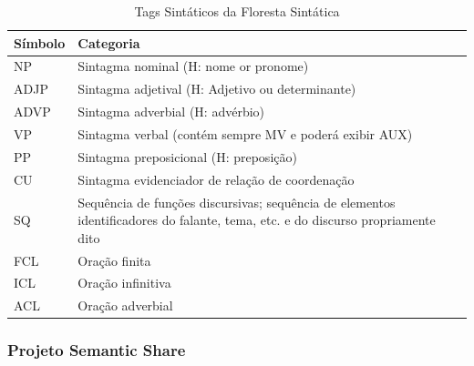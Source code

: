 \begin{table}[H]
   \centering
   \small
   \caption{ Tags Sintáticos da Floresta Sintática}
   

    \begin{tabular}{ | p{3cm} | p{10cm} | }
      \hline
        \textbf{Símbolo} & \textbf{Categoria}\\
        \hline
        \hline

            NP&Sintagma nominal
            (H: nome or pronome)\\
            \hline

            ADJP&Sintagma adjetival
            (H: Adjetivo ou determinante)\\
            \hline

            ADVP&Sintagma adverbial
            (H: advérbio)\\
            \hline

            VP&Sintagma verbal
            (contém sempre MV e poderá exibir AUX)\\
            \hline

            PP&Sintagma preposicional
            (H: preposição)\\
            \hline

            CU&Sintagma evidenciador de relação de coordenação\\
            \hline

            SQ&Sequência de funções discursivas; sequência de elementos identificadores do falante, tema, etc. e do discurso propriamente dito\\


            \hline

            FCL& Oração finita\\

            \hline

            ICL&Oração infinitiva\\

            \hline

            ACL&Oração adverbial\\

            \hline


   \end{tabular}
   \label{tbl:floresta_sintatica_cats}
\end{table}

\subsubsection{Projeto Semantic Share}
\label{sub:sub_semantic_corpus}

